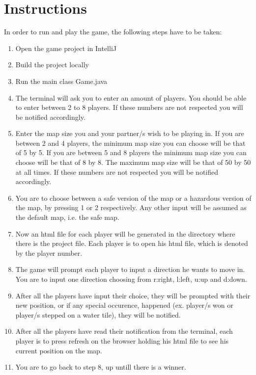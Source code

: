 \documentclass{article}
\begin{document}

\clearpage

\section{Instructions}
In order to run and play the game, the following steps have to be taken:

    \begin{enumerate}
        \item Open the game project in IntelliJ
        \item Build the project locally
        \item Run the main class Game.java
        \item The terminal will ask you to enter an amount of players. You should be able to enter between 2 to 8 players. If these numbers are not respected you will be notified accordingly.
        \item Enter the map size you and your partner/s wish to be playing in. If you are between 2 and 4 players, the minimum map size you can choose will be that of 5 by 5. If you are between 5 and 8 players the minimum map size you can choose will be that of 8 by 8. The maximum map size will be that of 50 by 50 at all times. If these numbers are not respected you will be notified accordingly.
        \item You are to choose between a safe version of the map or a hazardous version of the map, by pressing 1 or 2 respectively. Any other input will be assumed as the default map, i.e. the safe map. 
        \item Now an html file for each player will be generated in the directory where there is the project file. Each player is to open his html file, which is denoted by the player number. 
        \item The game will prompt each player to input a direction he wants to move in. You are to input one direction choosing from r:right, l:left, u:up and d:down.
        \item After all the players have input their choice, they will be prompted with their new position, or if any special occurence, happened (ex. player/s won or player/s stepped on a water tile), they will be notified.
        \item After all the players have read their notification from the terminal, each player is to press refresh on the browser holding his html file to see his current position on the map.
        \item You are to go back to step 8, up untill there is a winner.
    \end{enumerate}
\end{document}
